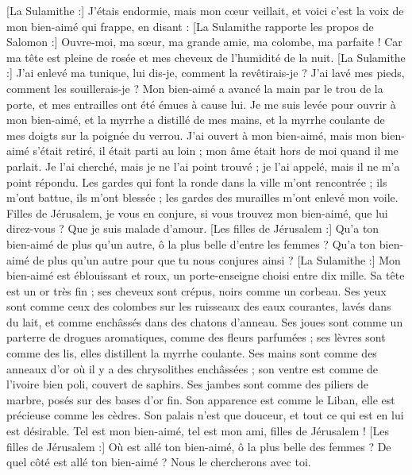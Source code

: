 \begin{multicols}{2}
[La Sulamithe :] J'étais endormie, mais mon cœur veillait, et voici c'est la voix de mon bien-aimé qui frappe, en disant : [La Sulamithe rapporte les propos de Salomon :] Ouvre-moi, ma sœur, ma grande amie, ma colombe, ma parfaite ! Car ma tête est pleine de rosée et mes cheveux de l'humidité de la nuit.
[La Sulamithe :] J'ai enlevé ma tunique, lui dis-je, comment la revêtirais-je ? J'ai lavé mes pieds, comment les souillerais-je ?
Mon bien-aimé a avancé la main par le trou de la porte, et mes entrailles ont été émues à cause lui.
Je me suis levée pour ouvrir à mon bien-aimé, et la myrrhe a distillé de mes mains, et la myrrhe coulante de mes doigts sur la poignée du verrou.
J'ai ouvert à mon bien-aimé, mais mon bien-aimé s'était retiré, il était parti au loin ; mon âme était hors de moi quand il me parlait. Je l'ai cherché, mais je ne l'ai point trouvé ; je l'ai appelé, mais il ne m'a point répondu.
Les gardes qui font la ronde dans la ville m'ont rencontrée ; ils m'ont battue, ils m'ont blessée ; les gardes des murailles m'ont enlevé mon voile.
Filles de Jérusalem, je vous en conjure, si vous trouvez mon bien-aimé, que lui direz-vous ? Que je suis malade d'amour.
[Les filles de Jérusalem :] Qu'a ton bien-aimé de plus qu'un autre, ô la plus belle d'entre les femmes ? Qu'a ton bien-aimé de plus qu'un autre pour que tu nous conjures ainsi ?
[La Sulamithe :] Mon bien-aimé est éblouissant et roux, un porte-enseigne choisi entre dix mille.
Sa tête est un or très fin ; ses cheveux sont crépus, noirs comme un corbeau.
Ses yeux sont comme ceux des colombes sur les ruisseaux des eaux courantes, lavés dans du lait, et comme enchâssés dans des chatons d'anneau. 
Ses joues sont comme un parterre de drogues aromatiques, comme des fleurs parfumées ; ses lèvres sont comme des lis, elles distillent la myrrhe coulante. 
Ses mains sont comme des anneaux d'or où il y a des chrysolithes enchâssées ; son ventre est comme de l'ivoire bien poli, couvert de saphirs.
Ses jambes sont comme des piliers de marbre, posés sur des bases d'or fin. Son apparence est comme le Liban, elle est précieuse comme les cèdres.
Son palais n'est que douceur, et tout ce qui est en lui est désirable. Tel est mon bien-aimé, tel est mon ami, filles de Jérusalem !
\VerseOne{}[Les filles de Jérusalem :] Où est allé ton bien-aimé, ô la plus belle des femmes ? De quel côté est allé ton bien-aimé ? Nous le chercherons avec toi.

\end{multicols}
